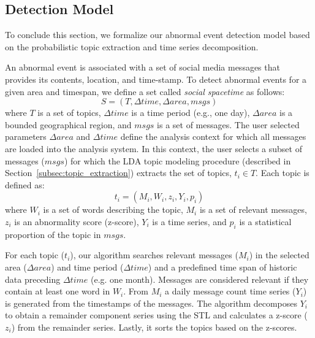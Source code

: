 \subsection{Detection Model}
\label{subsec:analysis_multi_social}
To conclude this section, we formalize our abnormal event detection model based on the probabilistic topic extraction and time series decomposition.

An abnormal event is associated with a set of social media messages that provides
its contents, location, and time-stamp.
To detect abnormal events for a given area and timespan,
we define a set called \textit{social spacetime} as follows:
\begin{equation}
S = (T, \Delta{time}, \Delta{area}, msgs)
\end{equation}
where $T$ is a set of topics,
$\Delta{time}$ is a time period (e.g., one day),
$\Delta{area}$ is a bounded geographical region, 
and $msgs$ is a set of messages.
The user selected parameters $\Delta{area}$ and $\Delta{time}$ define the analysis context for which all messages are loaded into the analysis system.
In this context, the user selects a subset of messages ($msgs$) for which the LDA topic modeling procedure (described in Section~\ref{subsec:topic_extraction}) extracts the set of topics, $t_i \in T$. 
Each topic is defined as:
\begin{equation}
t_i = (M_i, W_i, z_i, Y_i, p_i)
\end{equation}
where 
$W_i$ is a set of words describing the topic, 
$M_i$ is a set of relevant messages,
$z_i$ is an abnormality score (z-score), 
$Y_i$ is a time series, 
and 
$p_i$ is a statistical proportion of the topic in $msgs$.

For each topic ($t_i$), our algorithm searches relevant messages ($M_i$) in the selected area ($\Delta{area}$) and time period ($\Delta{time}$) and a predefined time span of historic data preceding $\Delta{time}$ (e.g. one month).
Messages are considered relevant if they contain at least one word in $W_i$.
From $M_i$ a daily message count time series ($Y_i$) is generated from the timestamps of the messages.
The algorithm decomposes $Y_i$ to obtain a remainder component series using the STL 
and calculates a z-score ($z_i$) from the remainder series.
Lastly, it sorts the topics based on the z-scores.

